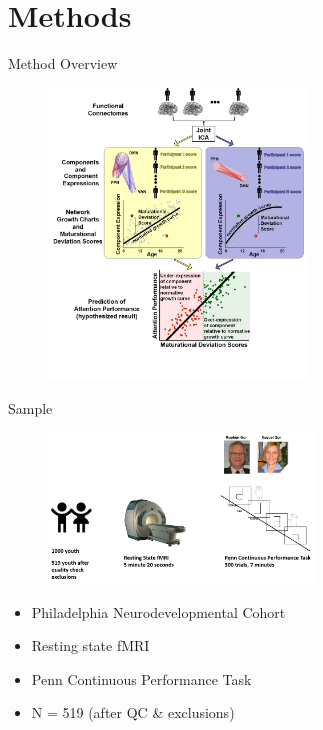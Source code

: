 \documentclass[presentation]{beamer}
\begin{document}
\section{Methods}
\label{sec:orgheadline19}
\begin{frame}[label={sec:orgheadline4}]{Method Overview}
\begin{figure}[htb]
\centering
\includegraphics[height=7.75cm]{./Figures/Figure1.png}
\end{figure}
\end{frame}
\begin{frame}[label={sec:orgheadline5}]{Sample}
\begin{figure}[htb]
\centering
\includegraphics[height=4cm]{./Figures/PNC.png}
\end{figure}
\begin{itemize}
\item Philadelphia Neurodevelopmental Cohort
\item Resting state fMRI
\item Penn Continuous Performance Task
\item N = 519 (after QC \& exclusions)
\end{itemize}
\end{frame}
\end{document}
